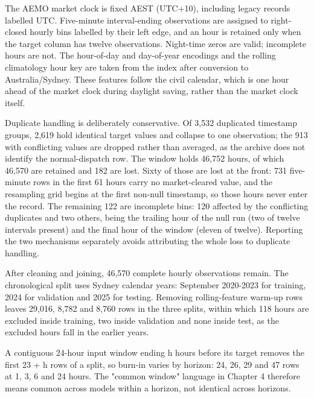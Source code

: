 The AEMO market clock is fixed AEST (UTC+10), including legacy records labelled UTC. Five-minute interval-ending observations are assigned to right-closed hourly bins labelled by their left edge, and an hour is retained only when the target column has twelve observations. Night-time zeros are valid; incomplete hours are not. The hour-of-day and day-of-year encodings and the rolling climatology hour key are taken from the index after conversion to Australia/Sydney. These features follow the civil calendar, which is one hour ahead of the market clock during daylight saving, rather than the market clock itself.

Duplicate handling is deliberately conservative. Of 3,532 duplicated timestamp groups, 2,619 hold identical target values and collapse to one observation; the 913 with conflicting values are dropped rather than averaged, as the archive does not identify the normal-dispatch row. The window holds 46,752 hours, of which 46,570 are retained and 182 are lost. Sixty of those are lost at the front: 731 five-minute rows in the first 61 hours carry no market-cleared value, and the resampling grid begins at the first non-null timestamp, so those hours never enter the record. The remaining 122 are incomplete bins: 120 affected by the conflicting duplicates and two others, being the trailing hour of the null run (two of twelve intervals present) and the final hour of the window (eleven of twelve). Reporting the two mechanisms separately avoids attributing the whole loss to duplicate handling.

After cleaning and joining, 46,570 complete hourly observations remain. The chronological split uses Sydney calendar years: September 2020-2023 for training, 2024 for validation and 2025 for testing. Removing rolling-feature warm-up rows leaves 29,016, 8,782 and 8,760 rows in the three splits, within which 118 hours are excluded inside training, two inside validation and none inside test, as the excluded hours fall in the earlier years.

A contiguous 24-hour input window ending h hours before its target removes the first 23 + h rows of a split, so burn-in varies by horizon: 24, 26, 29 and 47 rows at 1, 3, 6 and 24 hours. The "common window" language in Chapter 4 therefore means common across models within a horizon, not identical across horizons.


